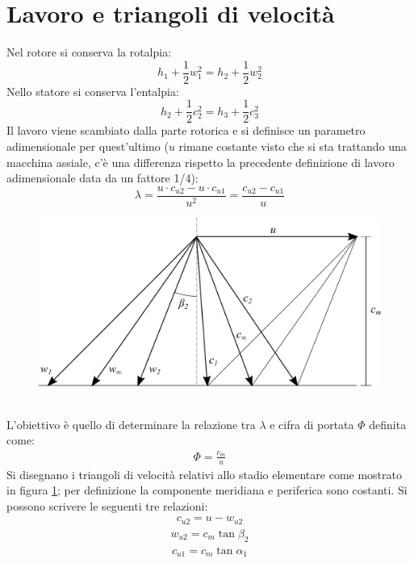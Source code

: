\section{Lavoro e triangoli di velocità}
Nel rotore si conserva la rotalpia:
\begin{equation}
h_1 + \frac{1}{2} w_1^2 = h_2 + \frac{1}{2} w_2^2
\end{equation}
Nello statore si conserva l'entalpia:
\begin{equation}
h_2 + \frac{1}{2} c_2^2 = h_3 + \frac{1}{2} c_3^2
\end{equation}
Il lavoro viene scambiato dalla parte rotorica e si definisce un parametro adimensionale per quest'ultimo ($u$ rimane costante visto che si sta trattando una macchina assiale, c'è una differenza rispetto la precedente definizione di lavoro adimensionale data da un fattore 1/4):
\begin{equation}
\lambda = \frac{u \cdot c_{u2} - u \cdot c_{u1}}{u^2} = \frac{c_{u2} - c_{u1}}{u}
\end{equation}
\begin{figure}
\centering
  \includegraphics[width=.8\textwidth]{fig/triangComp.pdf}
\caption{}
\label{fig:triangComp}
\end{figure}
\\L'obiettivo è quello di determinare la relazione tra $\lambda$ e cifra di portata $\Phi$ definita come:
\begin{align*}
\Phi = \frac{c_m}{u}
\end{align*}
Si disegnano i triangoli di velocità relativi allo stadio elementare come mostrato in figura \ref{fig:triangComp}; per definizione la componente meridiana e periferica sono costanti. Si possono scrivere le seguenti tre relazioni:
\begin{align*}
c_{u2} = u - w_{u2}
\end{align*}
\begin{align*}
w_{u2} = c_m \tan \beta_2
\end{align*}
\begin{align*}
c_{u1} = c_m \tan \alpha_1
\end{align*}
